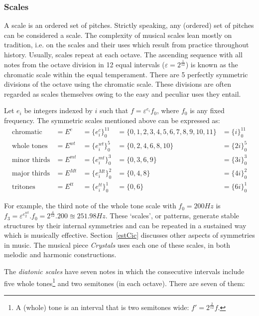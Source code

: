 \subsubsection{Scales}\label{subsec:escalas}
A scale is an ordered set of pitches. Strictly speaking, any (ordered) set of pitches can be considered a scale. The complexity of musical scales lean mostly on tradition, i.e. on the scales and their uses which result from practice throughout history. Usually, scales repeat at each octave. The ascending sequence with all notes from the octave division in 12 equal intervals ($\varepsilon=2^{\frac{1}{12}}$) is known as the chromatic scale within the equal temperament. There are 5 perfectly symmetric divisions of the octave using the chromatic scale. These divisions are often regarded as scales themselves owing to the easy and peculiar uses they entail.

Let $e_i$ be integers indexed by $i$ such that
$f=\varepsilon^{e_i} f_0$,
where $f_0$ is any fixed frequency.
The symmetric scales mentioned above can be expressed as:
\begin{equation}\label{escSim}
\begin{aligned}
	\text{chromatic}    & = E^c    & = \{e_i^c\}_0^{11}   & =  \{0,1,2,3,4,5,6,7,8,9,10,11\} & = \{i\}_0^{11}\\
	\text{whole tones}  & = E^{wt} & = \{e_i^{wt}\}_0^{5} & = \{0,2,4,6,8,10\}               & = \{2i\}_0^{5} \\
	\text{minor thirds} & = E^{mt} & = \{e_i^{mt}\}_0^{3} & = \{0,3,6,9\}                    & = \{3i\}_0^3 \\
	\text{major thirds} & = E^{Mt} & = \{e_i^{Mt}\}_0^{2} & = \{0,4,8\}                      & = \{4i\}_0^2\\
	\text{tritones}     & = E^{tt} & = \{e_i^{tt}\}_0^{1} & = \{ 0, 6 \}                     & = \{6i\}_0^1
\end{aligned}
\end{equation}

For example, the third note of the whole tone scale with $f_0=200Hz$ is $f_3=\varepsilon^{e_2^{wt}}.
f_0 = 2^{\frac{4}{12}} .
200 \approxeq 251.98
Hz$.
These `scales', or patterns, generate stable structures by their internal symmetries and can be repeated in a sustained way which is musically effective.
Section~\ref{estCic} discusses other aspects of symmetries in music.
The musical piece \emph{Crystals} uses each one of these scales, in both melodic and harmonic constructions.

The \emph{diatonic scales} have seven notes in which the consecutive intervals include five whole tones\footnote{A (whole) tone is an interval that is two semitones wide: $f'=2^{\frac{2}{12}}f$.} and two semitones (in each octave). There are seven of them:

